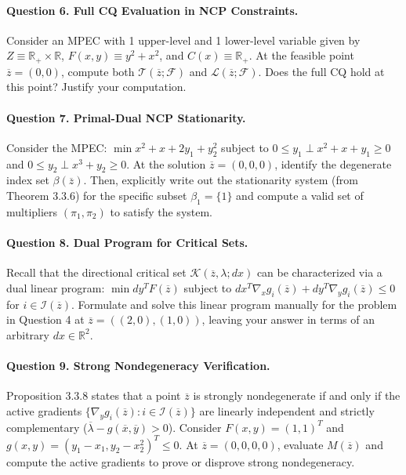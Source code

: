 \documentclass[pdflatex,sn-mathphys-num]{sn-jnl}%
\theoremstyle{definition}
\begin{document}
    \paragraph{Question 6. Full CQ Evaluation in NCP Constraints.} 
    Consider an MPEC with 1 upper-level and 1 lower-level variable given by $Z \equiv \mathbb{R}_+ \times \mathbb{R}$, $F(x,y) \equiv y^2+x^2$, and $C(x) \equiv \mathbb{R}_+$.
    At the feasible point $\overline{z} = (0,0)$, compute both $\mathcal{T}(\overline{z}; \mathcal{F})$ and $\mathcal{L}(\overline{z}; \mathcal{F})$. Does the full CQ hold at this point? Justify your computation.

    \paragraph{Question 7. Primal-Dual NCP Stationarity.} Consider the MPEC: $\min x^2+x+2y_1+y_2^2$ subject to $0 \le y_1 \perp x^2+x+y_1 \ge 0$ and $0 \le y_2 \perp x^3+y_2 \ge 0$. 
    At the solution $\overline{z}=(0,0,0)$, identify the degenerate index set $\beta(\overline{z})$. Then, explicitly write out the stationarity system (from Theorem 3.3.6) for the specific subset $\beta_1 = \{1\}$ and compute a valid set of multipliers $(\pi_1, \pi_2)$ to satisfy the system.

    \paragraph{Question 8. Dual Program for Critical Sets.} Recall that the directional critical set $\mathcal{K}(\overline{z}, \lambda; dx)$ can be characterized via a dual linear program: $\min dy^T F(\overline{z})$ subject to $dx^T \nabla_x g_i(\overline{z}) + dy^T \nabla_y g_i(\overline{z}) \le 0$ for $i \in \mathcal{I}(\overline{z})$.
    Formulate and solve this linear program manually for the problem in Question 4 at $\overline{z} = ((2,0), (1,0))$, leaving your answer in terms of an arbitrary $dx \in \mathbb{R}^2$.

    \paragraph{Question 9. Strong Nondegeneracy Verification.} Proposition 3.3.8 states that a point $\overline{z}$ is strongly nondegenerate if and only if the active gradients $\{\nabla_y g_i(\overline{z}) : i \in \mathcal{I}(\overline{z})\}$ are linearly independent and strictly complementary ($\overline{\lambda} - g(\overline{x},\overline{y}) > 0$).
    Consider $F(x,y) = (1,1)^T$ and $g(x,y) = (y_1-x_1, y_2-x_2^2)^T \le 0$. At $\overline{z} = (0,0,0,0)$, evaluate $M(\overline{z})$ and compute the active gradients to prove or disprove strong nondegeneracy.
\end{document}
